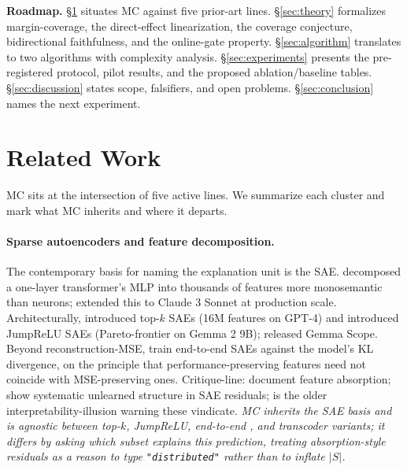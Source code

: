 \documentclass[10pt]{article}
\begin{document}
\textbf{Roadmap.} \S\ref{sec:related} situates MC against five prior-art lines. \S\ref{sec:theory} formalizes margin-coverage, the direct-effect linearization, the coverage conjecture, bidirectional faithfulness, and the online-gate property. \S\ref{sec:algorithm} translates to two algorithms with complexity analysis. \S\ref{sec:experiments} presents the pre-registered protocol, pilot results, and the proposed ablation/baseline tables. \S\ref{sec:discussion} states scope, falsifiers, and open problems. \S\ref{sec:conclusion} names the next experiment.

\section{Related Work}
\label{sec:related}

MC sits at the intersection of five active lines. We summarize each cluster and mark what MC inherits and where it departs.

\paragraph{Sparse autoencoders and feature decomposition.} The contemporary basis for naming the explanation unit is the SAE. \citet{bricken2023monosemanticity} decomposed a one-layer transformer's MLP into thousands of features more monosemantic than neurons; \citet{templeton2024scaling} extended this to Claude 3 Sonnet at production scale. Architecturally, \citet{gao2024scaling} introduced top-$k$ SAEs (16M features on GPT-4) and \citet{rajamanoharan2024jumprelu} introduced JumpReLU SAEs (Pareto-frontier on Gemma 2 9B); \citet{lieberum2024gemma} released Gemma Scope. Beyond reconstruction-MSE, \citet{braun2024endtoend} train end-to-end SAEs against the model's KL divergence, on the principle that performance-preserving features need not coincide with MSE-preserving ones. Critique-line: \citet{chanin2024absorption} document feature absorption; \citet{engels2024darkmatter,engels2024notall} show systematic unlearned structure in SAE residuals; \citet{bolukbasi2021interpretability} is the older interpretability-illusion warning these vindicate. \emph{MC inherits the SAE basis and is agnostic between top-$k$, JumpReLU, end-to-end \citep{braun2024endtoend}, and transcoder \citep{dunefsky2024transcoders} variants; it differs by asking which subset explains \emph{this} prediction, treating absorption-style residuals as a reason to type \texttt{"distributed"} rather than to inflate $|S|$.}
\end{document}
